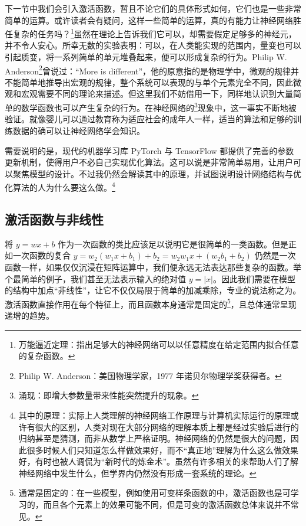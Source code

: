 下一节中我们会引入激活函数，暂且不论它们的具体形式如何，它们也是一些非常简单的运算。或许读者会有疑问，这样一些简单的运算，真的有能力让神经网络胜任复杂的任务吗？\footnote{万能逼近定理：指出足够大的神经网络可以以任意精度在给定范围内拟合任意的复杂函数。}虽然在理论上告诉我们它可以，却需要假定足够多的神经元，并不令人安心。所幸无数的实验表明：可以，在人类能实现的范围内，量变也可以引起质变，将一系列简单的单元堆叠起来，便可以形成复杂的行为。Philip W. Anderson\footnote{Philip W. Anderson：美国物理学家，1977 年诺贝尔物理学奖获得者。}曾说过：“More is different”，他的原意指的是物理学中，微观的规律并不能简单地推导出宏观的规律，整个系统可以表现的与单个元素完全不同，因此微观和宏观需要不同的理论来描述。但这里我们不妨借用一下，同样地认识到大量简单的数学函数也可以产生复杂的行为。在神经网络的\footnote{涌现：即增大参数量带来性能突然提升的现象。}现象中，这一事实不断地被验证。就像婴儿可以通过教育称为适应社会的成年人一样，适当的算法和足够的训练数据的确可以让神经网络学会知识。

需要说明的是，现代的机器学习库 PyTorch 与 TensorFlow 都提供了完善的参数更新机制，使得用户不必自己实现优化算法。这可以说是非常简单易用，让用户可以聚焦模型的设计。不过我仍然会解读其中的原理，并试图说明设计网络结构与优化算法的人为什么要这么做。\footnote{其中的原理：实际上人类理解的神经网络工作原理与计算机实际运行的原理或许有很大的区别，人类对现在大部分网络的理解本质上都是经过实验后进行的归纳甚至是猜测，而非从数学上严格证明。神经网络的仍然是很大的问题，因此很多时候人们只知道怎么样做效果好，而不“真正地”理解为什么这么做效果好，有时也被人调侃为“新时代的炼金术”。虽然有许多相关的来帮助人们了解神经网络中发生什么，但学界内仍然没有形成一套系统的理论。}

\newpage

\subsection{激活函数与非线性}

将 $y=wx+b$ 作为一次函数的类比应该足以说明它是很简单的一类函数。但是正如一次函数的复合 $ y = w_2(w_1x+b_1)+b_2 = w_2w_1x + (w_2b_1+b_2) $
仍然是一次函数一样，如果仅仅沉浸在矩阵运算中，我们便永远无法表达那些复杂的函数。举个最简单的例子，我们甚至无法表示输入的绝对值 $y=|x|$。因此我们需要在模型的结构中加点“非线性”，让它不仅仅局限于简单的加减乘除，专业的说法称之为。激活函数直接作用在每个特征上，而且函数本身通常是固定的\footnote{通常是固定的：在一些模型，例如使用可变样条函数的中，激活函数也是可学习的，而且各个元素上的效果可能不同，但是可变的激活函数总体来说并不常见。}，且总体通常呈现递增的趋势。

